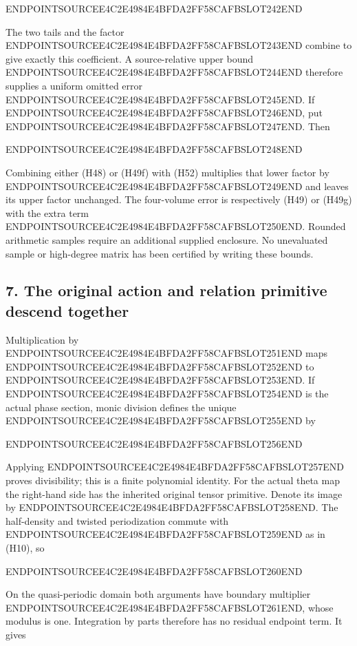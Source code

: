 ENDPOINTSOURCEE4C2E4984E4BFDA2FF58CAFBSLOT242END

The two tails and the factor ENDPOINTSOURCEE4C2E4984E4BFDA2FF58CAFBSLOT243END combine to give exactly this coefficient. A source-relative upper bound ENDPOINTSOURCEE4C2E4984E4BFDA2FF58CAFBSLOT244END therefore supplies a uniform omitted error ENDPOINTSOURCEE4C2E4984E4BFDA2FF58CAFBSLOT245END. If ENDPOINTSOURCEE4C2E4984E4BFDA2FF58CAFBSLOT246END, put ENDPOINTSOURCEE4C2E4984E4BFDA2FF58CAFBSLOT247END. Then

ENDPOINTSOURCEE4C2E4984E4BFDA2FF58CAFBSLOT248END

Combining either (H48) or (H49f) with (H52) multiplies that lower factor by ENDPOINTSOURCEE4C2E4984E4BFDA2FF58CAFBSLOT249END and leaves its upper factor unchanged. The four-volume error is respectively (H49) or (H49g) with the extra term ENDPOINTSOURCEE4C2E4984E4BFDA2FF58CAFBSLOT250END. Rounded arithmetic samples require an additional supplied enclosure. No unevaluated sample or high-degree matrix has been certified by writing these bounds.

\subsection{7. The original action and relation primitive descend together}\label{endpoint-holonomy_original--the-original-action-and-relation-primitive-descend-together}

Multiplication by ENDPOINTSOURCEE4C2E4984E4BFDA2FF58CAFBSLOT251END maps ENDPOINTSOURCEE4C2E4984E4BFDA2FF58CAFBSLOT252END to ENDPOINTSOURCEE4C2E4984E4BFDA2FF58CAFBSLOT253END. If ENDPOINTSOURCEE4C2E4984E4BFDA2FF58CAFBSLOT254END is the actual phase section, monic division defines the unique ENDPOINTSOURCEE4C2E4984E4BFDA2FF58CAFBSLOT255END by

ENDPOINTSOURCEE4C2E4984E4BFDA2FF58CAFBSLOT256END

Applying ENDPOINTSOURCEE4C2E4984E4BFDA2FF58CAFBSLOT257END proves divisibility; this is a finite polynomial identity. For the actual theta map the right-hand side has the inherited original tensor primitive. Denote its image by ENDPOINTSOURCEE4C2E4984E4BFDA2FF58CAFBSLOT258END. The half-density and twisted periodization commute with ENDPOINTSOURCEE4C2E4984E4BFDA2FF58CAFBSLOT259END as in (H10), so

ENDPOINTSOURCEE4C2E4984E4BFDA2FF58CAFBSLOT260END

On the quasi-periodic domain both arguments have boundary multiplier ENDPOINTSOURCEE4C2E4984E4BFDA2FF58CAFBSLOT261END, whose modulus is one. Integration by parts therefore has no residual endpoint term. It gives

